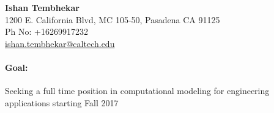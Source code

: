 \documentclass[10pt,fleqn]{article}
\begin{document}


\begin{center}
\LARGE \textbf{Ishan Tembhekar} \small \\[0.16cm]
1200 E. California Blvd, MC 105-50, Pasadena CA 91125 \\
Ph No: +16269917232 \\
\href{mailto:ishan.tembhekar@caltech.edu}{ishan.tembhekar@caltech.edu} \hfill
\end{center}
\paragraph*{Goal:} Seeking a full time position in computational modeling for engineering applications starting Fall 2017
\end{document}
